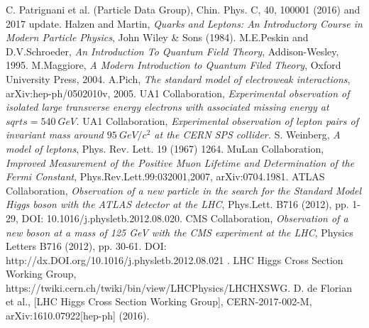 \begin{thebibliography}{999}

		 C. Patrignani et al. (Particle Data Group), Chin. Phys. C, 40, 100001 (2016) and 2017 update.
		 Halzen and Martin, \emph{Quarks and Leptons: An Introductory Course in Modern Particle Physics}, John Wiley \& Sons (1984).
		 M.E.Peskin and D.V.Schroeder, \emph{An Introduction To Quantum Field Theory}, Addison-Wesley, 1995.
		 M.Maggiore, \emph{A Modern Introduction to Quantum Filed Theory}, Oxford University Press, 2004.
		 A.Pich, \emph{The standard model of electroweak interactions}, arXiv:hep-ph/0502010v,  2005.
		  UA1 Collaboration, \emph{Experimental observation of isolated large transverse energy electrons with associated missing energy at $sqrt{s}=540~GeV$.}
		 UA1 Collaboration, \emph{Experimental observation of lepton pairs of invariant mass around $95~GeV/c^{2}$ at the CERN SPS collider.}
		 S. Weinberg, \emph{A model of leptons}, Phys. Rev. Lett. 19 (1967) 1264.
		 MuLan Collaboration, \emph{Improved Measurement of the Positive Muon Lifetime and Determination of the Fermi Constant}, Phys.Rev.Lett.99:032001,2007, 	arXiv:0704.1981.
		 ATLAS Collaboration, \emph{Observation of a new particle in the search for the Standard Model Higgs boson with the ATLAS detector at the LHC},  Phys.Lett. B716 (2012), pp. 1-29, DOI: 	10.1016/j.physletb.2012.08.020.
		 CMS Collaboration, \emph{Observation of a new boson at a mass of 125 GeV with the CMS experiment at the LHC}, Physics Letters B716 (2012), pp. 30-61. DOI:   http://dx.DOI.org/10.1016/j.physletb.2012.08.021 .
		 LHC Higgs Cross Section Working Group, \\https://twiki.cern.ch/twiki/bin/view/LHCPhysics/LHCHXSWG.
		 D. de Florian et al., [LHC Higgs Cross Section Working Group], CERN-2017-002-M, arXiv:1610.07922[hep-ph] (2016).

\end{thebibliography}
